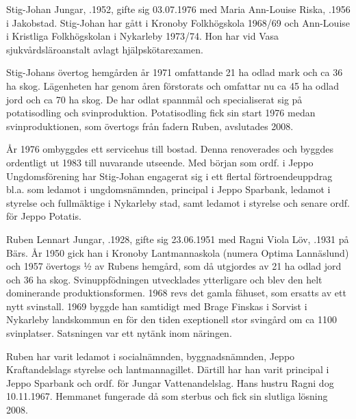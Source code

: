 


Stig-Johan Jungar, .1952, gifte sig 03.07.1976 med Maria Ann-Louise Riska, .1956 i Jakobstad. Stig-Johan har gått i Kronoby Folkhögskola 1968/69 och Ann-Louise i Kristliga Folkhögskolan i Nykarleby 1973/74. Hon har vid Vasa sjukvårdsläroanstalt avlagt hjälpskötarexamen.

Stig-Johans övertog hemgården år 1971 omfattande 21 ha odlad mark och ca 36 ha skog. Lägenheten har genom åren förstorats och omfattar nu ca 45 ha odlad jord och ca 70 ha skog. De har odlat spannmål och specialiserat sig på potatisodling och svinproduktion.  Potatisodling fick sin start 1976 medan svinproduktionen, som övertogs från fadern Ruben, avslutades 2008.

År 1976 ombyggdes ett servicehus till bostad. Denna renoverades och byggdes ordentligt ut 1983 till nuvarande utseende. Med början som ordf. i Jeppo Ungdomsförening har Stig-Johan engagerat sig i ett flertal förtroendeuppdrag bl.a. som ledamot i ungdomsnämnden, principal i Jeppo Sparbank, ledamot i styrelse och fullmäktige i Nykarleby stad, samt ledamot i styrelse och senare ordf. för Jeppo Potatis.





Ruben Lennart Jungar, .1928, gifte sig 23.06.1951 med Ragni Viola Löv, .1931 på Bärs. År 1950 gick han i Kronoby Lantmannaskola (numera Optima Lannäslund) och 1957 övertogs ½ av Rubens hemgård, som då utgjordes av 21 ha odlad jord och 36 ha skog. Svinuppfödningen utvecklades ytterligare och blev den helt dominerande produktionsformen. 1968 revs det gamla fähuset, som ersatts av ett nytt svinstall. 1969 byggde han samtidigt med Brage Finskas i Sorvist i Nykarleby landskommun en för den tiden exeptionell stor svingård om ca 1100 svinplatser. Satsningen var ett nytänk inom näringen.

Ruben har varit ledamot i socialnämnden, byggnadsnämnden, Jeppo Kraftandelslags styrelse och lantmannagillet. Därtill har han varit principal i Jeppo Sparbank och ordf. för Jungar Vattenandelslag. Hans hustru Ragni dog 10.11.1967. Hemmanet fungerade då som sterbus och fick sin slutliga lösning 2008.

